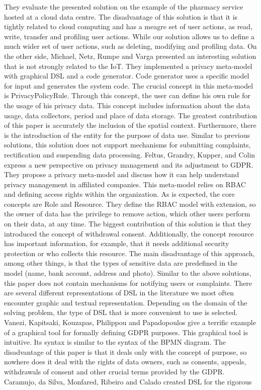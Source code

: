 \documentclass[11pt,english]{article}
\begin{document}
They evaluate the presented solution on the example of the pharmacy service hosted at a cloud data centre. The disadvantage of this solution is that it is tightly related to cloud computing and has a meagre set of user actions, as read, write, transfer and profiling user actions. While our solution allows us to define a much wider set of user actions, such as deleting, modifying and profiling data. On the other side, Michael, Netz, Rumpe and Varga \cite{michael2019towards} presented an interesting solution that is not strongly related to the IoT. They implemented a privacy meta-model with graphical DSL and a code generator. Code generator uses a specific model for input and generates the system code. The crucial concept in this meta-model is PrivacyPolicyRule. Through this concept, the user can define his own rule for the usage of his privacy data. This concept includes information about the data usage, data collectors, period and place of data storage. The greatest contribution of this paper is accurately the inclusion of the spatial context. Furthermore, there is the introduction of the entity for the purpose of data use. Similar to previous solutions, this solution does not support mechanisms for submitting complaints, rectification and suspending data processing. \newline Feltus, Grandry, Kupper, and Colin \cite{feltus2017model} express a new perspective on privacy management and its adjustment to GDPR. They propose a privacy meta-model and discuss how it can help understand privacy management in affiliated companies. This meta-model relies on RBAC and defining access rights within the organization. As is expected, the core concepts are Role and Resource. They define the RBAC model with extension, so the owner of data has the privilege to remove action, which other users perform on their data, at any time. The biggest contribution of this solution is that they introduced the concept of withdrawal consent. Additionally, the concept resource has important information, for example, that it needs additional security protection or who collects this resource. The main disadvantage of this approach, among other things, is that the types of sensitive data are predefined in the model (name, bank account, address and photo). Similar to the above solutions, this paper does not contain mechanisms for notifying users or complaints. \newline There are several different representations of DSL in the literature we most often encounter graphic and textual representation. Depending on the domain of the solving problem, the type of DSL that is more convenient to use is selected. Vanezi, Kapitsaki, Kouzapas, Philippou and Papadopoulos \cite{vanezi2020dialogop} give a terrific example of a graphical tool for formally defining GDPR purposes. This graphical tool is intuitive. Its syntax is similar to the syntax of the BPMN diagram. The disadvantage of this paper is that it deals only with the concept of purpose, so nowhere does it deal with the rights of data owners, such as consents, appeals, withdrawals of consent and other crucial terms provided by the GDPR. Caramujo, da Silva, Monfared, Ribeiro and Calado \cite{caramujo2019rsl} created DSL for the rigorous 
\end{document}
